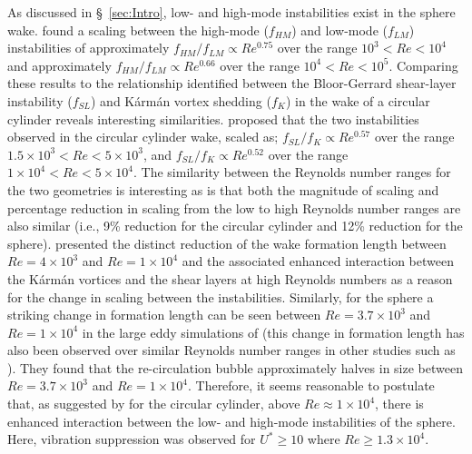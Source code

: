 \documentclass[3p]{elsarticle}
\newcommand{\Ustar}{\ensuremath{U^{*}}}
\begin{document}
As discussed in \S~\ref{sec:Intro}, low- and high-mode instabilities exist in the sphere wake. 
\citet{Kim1988} found a scaling between the high-mode ($f_{HM}$) and low-mode ($f_{LM}$) instabilities of approximately $f_{HM}/f_{LM} \propto Re^{0.75}$ over the range $10^3 < Re < 10^4$ and approximately $f_{HM}/f_{LM} \propto Re^{0.66}$ over the range $10^4 < Re < 10^5$. 
Comparing these results to the relationship identified between the Bloor-Gerrard shear-layer instability ($f_{SL}$) and K\'arm\'an vortex shedding ($f_K$) in the wake of a circular cylinder reveals interesting similarities. 
\citet{Thompson2005} proposed that the two instabilities observed in the circular cylinder wake, scaled as; $f_{SL}/f_{K} \propto Re^{0.57}$ over the range $1.5\times10^3 < Re < 5\times10^3$, and $f_{SL}/f_{K} \propto Re^{0.52}$ over the range $1\times10^4 < Re < 5\times10^4$. 
The similarity between the Reynolds number ranges for the two geometries is interesting as is that both the magnitude of scaling and percentage reduction in scaling from the low to high Reynolds number ranges are also similar (i.e., 9\% reduction for the circular cylinder and 12\% reduction for the sphere). 
\citet{Thompson2005} presented the distinct reduction of the wake formation length between $Re=4\times 10^3$ and $Re=1\times 10^4$ and the associated enhanced interaction between the K\'arm\'an vortices and the shear layers at high Reynolds numbers as a reason for the change in scaling between the instabilities. 
Similarly, for the sphere a striking change in formation length can be seen between $Re=3.7\times 10^3$ and $Re=1\times 10^4$ in the large eddy simulations of \citet{Yun2006} (this change in formation length has also been observed over similar Reynolds number ranges in other studies such as \citet{Jang2007}). 
They found that the re-circulation bubble approximately halves in size between $Re=3.7\times 10^3$ and $Re=1\times 10^4$. 
Therefore, it seems reasonable to postulate that, as suggested by \citet{Thompson2005} for the circular cylinder, above $Re\approx 1\times10^4$, there is enhanced interaction between the low- and high-mode instabilities of the sphere. 
Here, vibration suppression was observed for $\Ustar\geq10$ where $Re\geq1.3\times10^4$.
\end{document}
